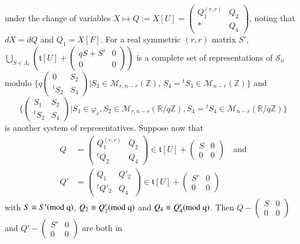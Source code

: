 under the change of variables $X\mapsto
Q:=X[U]=\left(\begin{smallmatrix} Q_{1}^{(r,r)} & Q_{2}\\ \ast & Q_{4}
\end{smallmatrix}\right)$, noting that
$dX=dQ$ and $Q_{1}=X[F]$. For a real symmetric $(r,r)$ matrix $S'$,
$\bigcup\limits_{S\in\Lambda_{r}}\left(\mathfrak{t}[U]+\left(\begin{smallmatrix}
  qS+S' & 0\\ 0 & 0
\end{smallmatrix}\right)\right)$ is a complete set of representations
of $\mathscr{S}_{n}$ modulo $\{q\left(\begin{smallmatrix} 0 &
  S_{2}\\ {}^{t}S_{2} & S_{4}\end{smallmatrix}\right)|S_{2}\in
\mathscr{M}_{r,n-r}(\mathbb{Z})$,
$S_{4}={}^{t}S_{4}\in\mathscr{M}_{n-r}(\mathbb{Z})\}$ and
$$
\{
\begin{pmatrix}
S_{1} & S_{2}\\
{}^{t}S_{2} & S_{4}
\end{pmatrix}
|S_{1}\in\varphi_{r},
S_{2}\in\mathscr{M}_{r,n-r}(\mathbb{R}/q\mathbb{Z}),
S_{4}={}^{t}S_{4}\in\mathscr{M}_{n-r}(\mathbb{R}/q\mathbb{Z})\}
$$
is another system of representatives. Suppose now that
\begin{align*}
Q&=
\begin{pmatrix}
Q^{(r,r)}_{1} & Q_{2}\\
{}^{t}Q_{2} & Q_{4}
\end{pmatrix}
\in \mathfrak{t}[U]+
\begin{pmatrix}
S & 0\\
0 & 0
\end{pmatrix}
\quad\text{and}\\
Q'&=
\begin{pmatrix}
Q_{1} & Q'_{2}\\
{}^{t}Q'_{2} & Q_{4}
\end{pmatrix}
\in \mathfrak{t}[U]+
\begin{pmatrix}
S' & 0\\
0 & 0
\end{pmatrix}
\end{align*}
with $S\equiv S'(\rm{mod} \; q)$, $Q_{2}\equiv Q'_{2}(\rm{mod} \; q)$ and
$Q_{4}\equiv Q'_{4}(\rm{mod} \; q)$. Then $Q-\left(\begin{smallmatrix} S &
  0\\ 0 & 0\end{smallmatrix}\right)$ and $Q'-\left(\begin{smallmatrix}
    S' & 0\\ 0 & 0  \end{smallmatrix}\right)$ are both in
